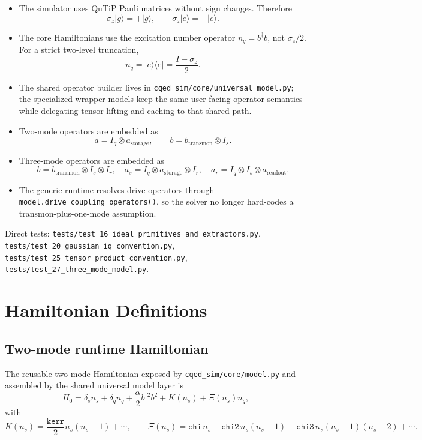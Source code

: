 \documentclass[11pt]{article}
\begin{document}
\begin{itemize}[leftmargin=1.5em]
  \item The simulator uses QuTiP Pauli matrices without sign changes. Therefore
  \[
  \sigma_z |g\rangle = +|g\rangle,
  \qquad
  \sigma_z |e\rangle = -|e\rangle.
  \]
  \item The core Hamiltonians use the excitation number operator \(n_q=b^\dagger b\),
  not \(\sigma_z/2\). For a strict two-level truncation,
  \[
  n_q = |e\rangle \langle e| = \frac{I-\sigma_z}{2}.
  \]
  \item The shared operator builder lives in
  \texttt{cqed\_sim/core/universal\_model.py}; the specialized wrapper models keep
  the same user-facing operator semantics while delegating tensor lifting and caching
  to that shared path.
  \item Two-mode operators are embedded as
  \[
  a = I_q \otimes a_{\mathrm{storage}},
  \qquad
  b = b_{\mathrm{transmon}} \otimes I_s.
  \]
  \item Three-mode operators are embedded as
  \[
  b = b_{\mathrm{transmon}} \otimes I_s \otimes I_r,\quad
  a_s = I_q \otimes a_{\mathrm{storage}} \otimes I_r,\quad
  a_r = I_q \otimes I_s \otimes a_{\mathrm{readout}}.
  \]
  \item The generic runtime resolves drive operators through
  \texttt{model.drive\_coupling\_operators()}, so the solver no longer hard-codes
  a transmon-plus-one-mode assumption.
\end{itemize}

\noindent
Direct tests:
\texttt{tests/test\_16\_ideal\_primitives\_and\_extractors.py},
\texttt{tests/test\_20\_gaussian\_iq\_convention.py},
\texttt{tests/test\_25\_tensor\_product\_convention.py},
\texttt{tests/test\_27\_three\_mode\_model.py}.

\section{Hamiltonian Definitions}
\subsection*{Two-mode runtime Hamiltonian}
The reusable two-mode Hamiltonian exposed by \texttt{cqed\_sim/core/model.py}
and assembled by the shared universal model layer is
\[
H_0
=
\delta_s n_s
+
\delta_q n_q
+
\frac{\alpha}{2} b^{\dagger 2} b^2
+
K(n_s)
+
\Xi(n_s) n_q,
\]
with
\[
K(n_s)
=
\frac{\texttt{kerr}}{2} n_s(n_s-1)
+\cdots,
\qquad
\Xi(n_s)
=
\texttt{chi}\, n_s
+
\texttt{chi2}\, n_s(n_s-1)
+
\texttt{chi3}\, n_s(n_s-1)(n_s-2)
+\cdots.
\]
\end{document}
